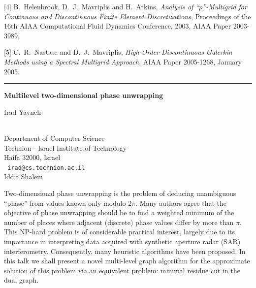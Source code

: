 \documentclass[twosided]{report}
\begin{document}
[4] B.~Helenbrook, D.~J.~Mavriplis and H.~Atkins,
{\em Analysis of
``$p$''-Multigrid for Continuous and Discontinuous Finite Element
Discretizations}, Proceedings of the 16th AIAA Computational Fluid
Dynamics Conference, 2003, AIAA Paper 2003-3989,

[5] C.~R.~Nastase and D.~J.~Mavriplis,
{\em High-Order Discontinuous
Galerkin Methods using a Spectral Multigrid Approach}, AIAA Paper
2005-1268, January 2005.

\begin{center}

\rule{6in}{1pt}
\end{center}

\begin{center}
{\large			\label{yavneh}
{\bf
Multilevel two-dimensional phase unwrapping
}

Irad Yavneh} \\
Department of Computer Science \\
Technion - Israel Institute of Technology \\
Haifa 32000, Israel
\\ {\tt
irad@cs.technion.ac.il
}
\\
Iddit Shalem
\end{center}

Two-dimensional phase unwrapping is the problem of deducing unambiguous
``phase'' from values known only modulo $2\pi$. Many authors agree that
the objective of phase unwrapping should be to find a weighted minimum
of the number of places where adjacent (discrete) phase values differ
by more than $\pi$. This NP-hard problem is of considerable practical
interest, largely due to its importance in interpreting data acquired
with synthetic aperture radar (SAR) interferometry. Consequently, many
heuristic algorithms have been proposed. In this talk we shall present
a novel multi-level graph algorithm for the approximate solution of
this problem via an equivalent problem: minimal residue cut in the dual
graph.
\end{document}
